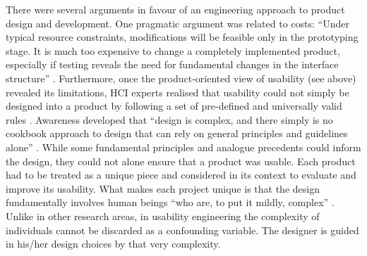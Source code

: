 There were several arguments in favour of an engineering approach to product design and development. One pragmatic argument was related to costs: ``Under typical resource constraints, modifications will be feasible only in the prototyping stage. It is much too expensive to change a completely implemented product, especially if testing reveals the need for fundamental changes in the interface structure'' \citep[13]{nielsen2012}. Furthermore, once the product-oriented view of usability (see above) revealed its limitations, HCI experts realised that usability could not simply be designed into a product by following a set of pre-defined and universally valid rules \citep[143]{bevan2015iso}. Awareness developed that ``design is complex, and there simply is no cookbook approach to design that can rely on general principles and guidelines alone'' \citep[918]{mayhew2007requirements}. While some fundamental principles and analogue precedents could inform the design, they could not alone ensure that a product was usable. Each product had to be treated as a unique piece and considered in its context to evaluate and improve its usability. What makes each project unique is that the design fundamentally involves human beings ``who are, to put it mildly, complex'' \citep[1]{lazar2017research}. Unlike in other research areas, in usability engineering the complexity of individuals cannot be discarded as a confounding variable. The designer is guided in his/her design choices by that very complexity.

